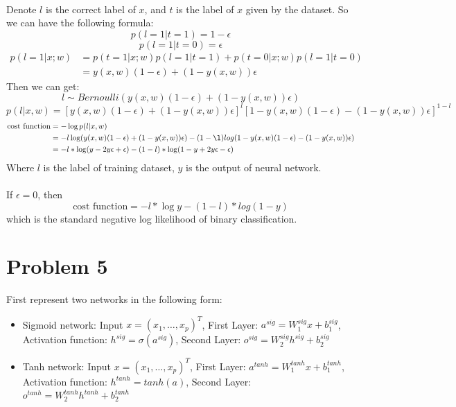 \documentclass[twoside]{article}
\begin{document}
\paragraph{}Denote $l$ is the correct label of $x$, and $t$ is the label of $x$ given by the dataset.
So we can have the following formula:
$$p(l = 1 | t=1) = 1-\epsilon$$
$$p(l = 1 | t=0) = \epsilon$$
\begin{align*}
p(l=1 | x; w) &= p(t=1| x; w)p(l=1|t=1)+p(t=0| x; w)p(l=1|t=0)\\
&=y(x, w)(1-\epsilon) + (1-y(x, w))\epsilon 
\end{align*}
Then we can get:
$$l \sim Bernoulli\left(y(x, w)(1-\epsilon) + (1-y(x, w))\epsilon\right)$$
$$p(l |x, w) =\left[y(x, w)(1-\epsilon) + (1-y(x, w))\epsilon\right]^{l}[1-y(x, w)(1-\epsilon) - (1-y(x, w))\epsilon]^{1-l}$$
\begin{align*}
\text{cost function} &= - \log p(l |x, w)\\
&= - l \log(y(x, w)(1-\epsilon) + (1-y(x, w))\epsilon ) - (1-\l) log(1-y(x, w)(1-\epsilon) - (1-y(x, w))\epsilon )\\
&= -l * \log(y-2y\epsilon+\epsilon) - (1-l) * \log(1-y+2y\epsilon-\epsilon)
\end{align*}
Where $l$ is the label of training dataset, $y$ is the output of neural network.

\paragraph{} If $\epsilon=0$, then $$\text{cost function} = -l * \log y - (1-l) *log(1-y)$$ which is the standard negative log likelihood of binary classification.

\section{Problem 5}
First represent two networks in the following form:
\begin{itemize}
\item Sigmoid network: Input $x=(x_1, \dots, x_p)^T$, First Layer: $a^{sig} = W^{sig}_{1}x + b^{sig}_1$, Activation function: $h^{sig} = \sigma (a^{sig})$, Second Layer: $o^{sig} = W^{sig}_2 h^{sig} + b^{sig}_2$

\item Tanh network: Input $x=(x_1, \dots, x_p)^T$, First Layer: $a^{tanh} = W^{tanh}_{1}x + b^{tanh}_1$, Activation function: $h^{tanh} = tanh (a)$, Second Layer: $o^{tanh} = W^{tanh}_2 h^{tanh} + b^{tanh}_2$
\end{itemize}
\end{document}
